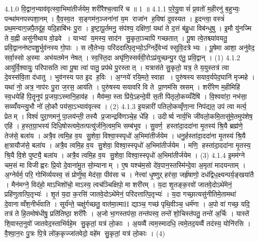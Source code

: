 4.1.0
वि॒द्वान॒भ्याव॑वृत्स्वा॒भिमा॑तीर्जयेम॒ शरी॑रैश्च॒त्वारि॑ च ॥ 1 ॥
4.1.1
प॒रे॒यु॒वासं॑ प्र॒वतो॑ म॒हीरनु॑ ब॒हुभ्यः॒ पन्था॑मनपस्पशा॒नम् । वै॒व॒स्व॒त स॒ङ्गम॑न॒ञ्जना॑नां य॒म राजा॑न ह॒विषा॑ दुवस्यत । इ॒दन्त्वा॒ वस्त्रं॑ प्रथ॒मन्वाग॒न्नपै॒तदू॑ह॒ यदि॒हाबि॑भः पु॒रा । इ॒ष्टा॒पू॒र्तमनु॒ संप॑श्य॒ दक्षि॑णां॒ यथा॑ ते द॒त्तं ब॑हु॒धा विब॑न्धुषु । इ॒मौ यु॑नज्मि ते व॒ह्नी असु॑नीथाय वो॒ढवे । याभ्यां य॒मस्य॒ साद॑न सु॒कृता॒ञ्चापि॑ गच्छतात् । पू॒षा त्वे॒तश्च्या॑वयतु॒ प्रवि॒द्वानन॑ष्टपशु॒र्भुव॑नस्य गो॒पाः । स त्वै॒तेभ्यः॒ परि॑ददात्पि॒तृभ्यो॒ऽग्निर्दे॒वेभ्य॑ स्सुवि॒दत्रेभ्यः । पू॒षेमा आशा॒ अनु॑वेद॒ सर्वा॒स्सो अ॒स्मा अभ॑यतमेन नेषत् । स्व॒स्ति॒दा अघृ॑णि॒स्सर्व॑वी॒रोऽप्र॑युच्छन्पु॒र ए॑तु॒ प्रवि॒द्वान् । (1)
4.1.2
आयु॑र्वि॒श्वायुः॒ परि॑पासति त्वा पू॒षा त्वा॑ पातु॒ प्रप॑थे पु॒रस्तात् । यत्रास॑ते सु॒कृतो॒ यत्र॒ ते य॒युस्तत्र॑ त्वा दे॒वस्स॑वि॒ता द॑धातु । भुव॑नस्य पत इ॒द ह॒विः । अ॒ग्नये॑ रयि॒मते॒ स्वाहा । पुरु॑षस्य सयाव॒र्यपेद॒घानि॑ मृज्महे । यथा॑ नो॒ अत्र॒ नाप॑रः पु॒रा ज॒रस॒ आय॑ति । पुरु॑षस्य सयावरि वि ते प्रा॒णम॑सि स्रसम् । शरी॑रेण म॒हीमिहि॑ स्व॒धयेहि॑ पि॒तॄनुप॑ प्र॒जया॒ऽस्मानि॒हाव॑ह । मैव॑म्मा॒स्ता प्रि॑ये॒ऽहन्दे॒वी स॒ती पि॑तृलो॒कय्यँदैषि॑ । वि॒श्ववा॑रा॒ नभ॑सा॒ सव्व्यँ॑यन्त्यु॒भौ नो॑ लो॒कौ पय॑सा॒ऽभ्याव॑वृत्स्व । (2)
4.1.3
इ॒यन्नारी॑ पतिलो॒कव्वृँणा॒ना निप॑द्यत॒ उप॑ त्वा मर्त्य॒ प्रेतम् । विश्वं॑ पुरा॒णमनु॑ पा॒लय॑न्ती॒ तस्यै प्र॒जान्द्रवि॑णञ्चे॒ह धे॑हि । उदीर्ष्व नार्य॒भि जी॑वलो॒कमि॒तासु॑मे॒तमुप॑शेष॒ एहि॑ । ह॒स्त॒ग्रा॒भस्य॑ दिधि॒षोस्त्वमे॒तत्पत्यु॑र्जनि॒त्वम॒भि सम्ब॑भूव । सु॒वर्ण॒ हस्ता॑दा॒ददा॑ना मृ॒तस्य॑ श्रि॒यै ब्रह्म॑णे॒ तेज॑से॒ बला॑य । अत्रै॒व त्वमि॒ह व॒य सु॒शेवा॒ विश्वा॒स्स्पृधो॑ अ॒भिमा॑तीर्जयेम । धनु॒र्\mbox{}हस्ता॑दा॒ददा॑ना मृ॒तस्य॑ श्रि॒यै क्ष॒त्रायौज॑से॒ बला॑य । अत्रै॒व त्वमि॒ह व॒य सु॒शेवा॒ विश्वा॒स्स्पृधो॑ अ॒भिमा॑तीर्जयेम । मणि॒ हस्ता॑दा॒ददा॑ना मृ॒तस्य॒ श्रि॒यै वि॒शे पुष्ट्यै॒ बला॑य । अत्रै॒व त्वमि॒ह व॒य सु॒शेवा॒ विश्वा॒स्स्पृधो॑ अ॒भिमा॑तीर्जयेम । (3)
4.1.4
इ॒मम॑ग्ने चम॒सं मा विजीह्वरः प्रि॒यो दे॒वाना॑मु॒त सो॒म्यानाम् । ए॒ष यश्च॑म॒सो दे॑व॒पान॒स्तस्मि॑न्दे॒वा अ॒मृता॑ मादयन्ताम् । अ॒ग्नेर्वर्म॒ परि॒ गोभि॑र्व्ययस्व॒ सं प्रोर्णु॑ष्व॒ मेद॑सा॒ पीव॑सा च । नेत्त्वा॑ धृ॒ष्णुऱ् हर॑सा॒ जर्\mbox{}हृ॑षाणो॒ दध॑द्विध॒क्ष्यन्पर्य॒ङ्खया॑तै । मैन॑मग्ने॒ विद॑हो॒ माऽभिशो॑चो॒ माऽस्य॒ त्वच॑ञ्चिक्षिपो॒ मा शरी॑रम् । य॒दा शृ॒तङ्क॒रवो॑ जातवे॒दोऽथे॑मेनं॒ प्रहि॑णुतात्पि॒तृभ्यः॑ । शृ॒तं य॒दा क॒रसि॑ जातवे॒दोऽथे॑मेनं॒ परि॑दत्तात्पि॒तृभ्यः॑ । य॒दा गच्छा॒त्यसु॑नीतिमे॒तामथा॑ दे॒वानाव्वँश॒नीर्भ॑वाति । सूर्य॑न्ते॒ चक्षु॑र्गच्छतु॒ वात॑मा॒त्माH द्याञ्च॒ गच्छ॑ पृथि॒वीञ्च॒ धर्म॑णा । अ॒पो वा॑ गच्छ॒ यदि॒ तत्र॑ ते हि॒तमोष॑धीषु॒ प्रति॑तिष्ठा॒ शरी॑रैः । अ॒जो भा॒गस्तप॑सा॒ तन्त॑पस्व॒ तन्ते॑ शो॒चिस्त॑पतु॒ तन्ते॑ अ॒र्चिः । यास्ते॑ शि॒वास्त॒नुवो॑ जातवेद॒स्ताभि॑र्वहे॒म सु॒कृतां॒ यत्र॑ लो॒काः । अ॒यव्वैं त्वम॒स्मादधि॒ त्वमे॒तद॒यव्वैं तद॑स्य॒ योनि॑रसि । वै॒श्वा॒न॒रः पु॒त्रः पि॒त्रे लो॑क॒कृज्जा॑तवेदो॒ वहे॑म सु॒कृतां॒ यत्र॑ लो॒काः । (4)
\anuvakamend

